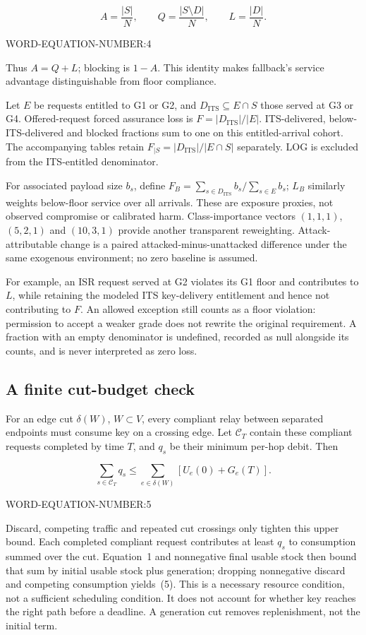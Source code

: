\documentclass[conference,a4paper]{IEEEtran}
\begin{document}
\[
A=\frac{|S|}{N},\qquad Q=\frac{|S\setminus D|}{N},\qquad L=\frac{|D|}{N}.
\]

WORD-EQUATION-NUMBER:4


Thus $A=Q+L$; blocking is $1-A$. This identity makes fallback's service advantage distinguishable from floor compliance.

Let $E$ be requests entitled to G1 or G2, and $D_{\mathrm{ITS}}\subseteq E\cap S$ those served at G3 or G4. Offered-request forced assurance loss is $F=|D_{\mathrm{ITS}}|/|E|$. ITS-delivered, below-ITS-delivered and blocked fractions sum to one on this entitled-arrival cohort. The accompanying tables retain $F_{\mid S}=|D_{\mathrm{ITS}}|/|E\cap S|$ separately. LOG is excluded from the ITS-entitled denominator.

For associated payload size $b_s$, define $F_B=\sum_{s\in D_{\mathrm{ITS}}}b_s/\sum_{s\in E}b_s$; $L_B$ similarly weights below-floor service over all arrivals. These are exposure proxies, not observed compromise or calibrated harm. Class-importance vectors $(1,1,1)$, $(5,2,1)$ and $(10,3,1)$ provide another transparent reweighting. Attack-attributable change is a paired attacked-minus-unattacked difference under the same exogenous environment; no zero baseline is assumed.

For example, an ISR request served at G2 violates its G1 floor and contributes to $L$, while retaining the modeled ITS key-delivery entitlement and hence not contributing to $F$. An allowed exception still counts as a floor violation: permission to accept a weaker grade does not rewrite the original requirement. A fraction with an empty denominator is undefined, recorded as null alongside its counts, and is never interpreted as zero loss.

\subsection{A finite cut-budget check}\label{sec:bound}
For an edge cut $\delta(W)$, $W\subset V$, every compliant relay between separated endpoints must consume key on a crossing edge. Let $\mathcal C_T$ contain these compliant requests completed by time $T$, and $q_s$ be their minimum per-hop debit. Then


\[
\sum_{s\in\mathcal C_T}q_s
\leq\sum_{e\in\delta(W)}\left[U_e(0)+G_e(T)\right].
\]

WORD-EQUATION-NUMBER:5


Discard, competing traffic and repeated cut crossings only tighten this upper bound. Each completed compliant request contributes at least $q_s$ to consumption summed over the cut. Equation~1 and nonnegative final usable stock then bound that sum by initial usable stock plus generation; dropping nonnegative discard and competing consumption yields~(5). This is a necessary resource condition, not a sufficient scheduling condition. It does not account for whether key reaches the right path before a deadline. A generation cut removes replenishment, not the initial term.
\end{document}
